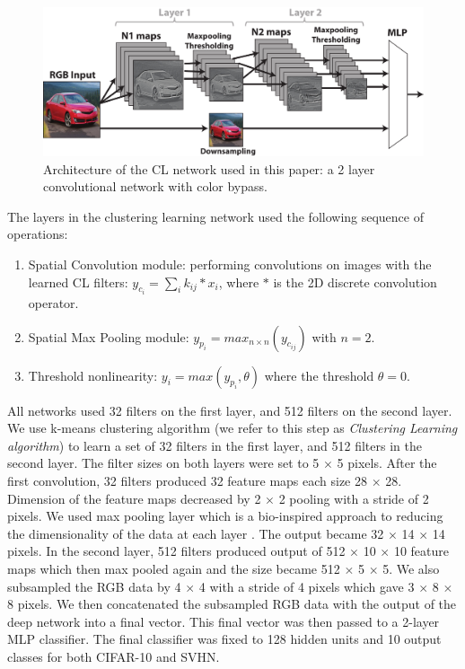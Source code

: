 \documentclass{article} %
\begin{document}
\begin{figure}
\includegraphics[width=5in]{overall-structure.pdf}
\caption{Architecture of the CL network used in this paper: a 2 layer convolutional network with color bypass.}
\label{fig-netarch}
\end{figure}


The layers in the clustering learning network used the following sequence of operations:
\begin{enumerate}
\item Spatial Convolution module: performing convolutions on images with the learned CL filters: $y_{c_i}=\sum_i{k_{ij}\ast x_i}$,
where $\ast$ is the 2D discrete convolution operator.
\item Spatial Max Pooling module: $y_{p_i} = max_{n \times n}(y_{c_{ij}})$ with $n = 2$.
\item Threshold nonlinearity: $y_i = max(y_{p_i}, \theta)$ where the threshold $\theta = 0$.
\end{enumerate}

All networks used 32 filters on the first layer, and 512 filters on the second layer.
We use k-means clustering algorithm (we refer to this step as \textit{Clustering Learning algorithm})
to learn a set of 32 filters in the first layer, and 512 filters in the second layer.
The filter sizes on both layers were set to 5 $\times$ 5 pixels.
After the first convolution, 32 filters produced 32 feature maps each size 28 $\times$ 28.
Dimension of the feature maps decreased by 2 $\times$ 2 pooling with a stride of 2 pixels.
We used max pooling layer which is a bio-inspired approach to reducing the dimensionality of the data at each layer \cite{lampl2004intracellular}.
The output became 32 $\times$ 14 $\times$ 14 pixels.
In the second layer, 512 filters produced output of 512 $\times$ 10 $\times$ 10 feature maps which then max pooled again and the size became 512 $\times$ 5 $\times$ 5. 
We also subsampled the RGB data by 4 $\times$ 4 with a stride of 4 pixels which gave 3 $\times$ 8 $\times$ 8 pixels.
We then concatenated the subsampled RGB data with the output of the deep network into a final vector.
This final vector was then passed to a 2-layer MLP classifier.
The final classifier was fixed to 128 hidden units and 10 output classes for both CIFAR-10 and SVHN.
\end{document}
